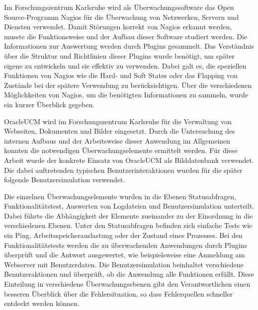 Im Forschungszentrum Karlsruhe wird als Überwachungssoftware das Open Source-Programm Nagios für die Überwachung von Netzwerken, Servern und Diensten verwendet.
Damit Störungen korrekt von Nagios erkannt werden, musste die Funktionsweise und der Aufbau dieser Software studiert werden.
Die Informationen zur Auswertung werden durch Plugins gesammelt.
Das Verständnis über die Struktur und Richtlinien dieser Plugins wurde benötigt, um später eigene zu entwickeln und sie effektiv zu verwenden.
Dabei galt es, die speziellen Funktionen von Nagios wie die Hard- und Soft States oder das Flapping von Zustände bei der spätere Verwendung zu berücksichtigen.
Über die verschiedenen Möglichkeiten von Nagios, um die benötigten Informationen zu sammeln, wurde ein kurzer Überblick gegeben.

\gls{OracleUCM} wird im Forschungszentrum Karlsruhe für die Verwaltung von Webseiten, Dokumenten und Bilder eingesetzt.
Durch die Untersuchung des internen Aufbaus und der Arbeitsweise dieser Anwendung im Allgemeinen konnten die notwendigen Überwachungselemente ermittelt werden.
Für diese Arbeit wurde der konkrete Einsatz von \gls{OracleUCM} als Bilddatenbank verwendet.
Die dabei auftretenden typischen Benutzerinteraktionen wurden für die später folgende Benutzersimulation verwendet.

Die einzelnen Überwachungselemente wurden in die Ebenen Statusabfragen, Funktionalitätstest, Auswerten von Logdateien und Benutzersimulation unterteilt.
Dabei führte die Abhängigkeit der Elemente zueinander zu der Einordnung in die verschiedenen Ebenen.
Unter den Statusabfragen befinden sich einfache Tests wie ein Ping, Arbeitsspeicherauslastung oder der Zustand eines Prozesses.
Bei den Funktionalitätstests werden die zu überwachenden Anwendungen durch Plugins überprüft und die Antwort ausgewertet, wie beispielsweise eine Anmeldung am Webserver mit Benutzerdaten.
Die Benutzersimulation beinhaltet verschiedene Benutzeraktionen und überprüft, ob die Anwendung alle Funktionen erfüllt.
Diese Einteilung in verschiedene Überwachungsebenen gibt den Verantwortlichen einen besseren Überblick über die Fehlersituation, so dass Fehlerquellen schneller entdeckt werden können.

